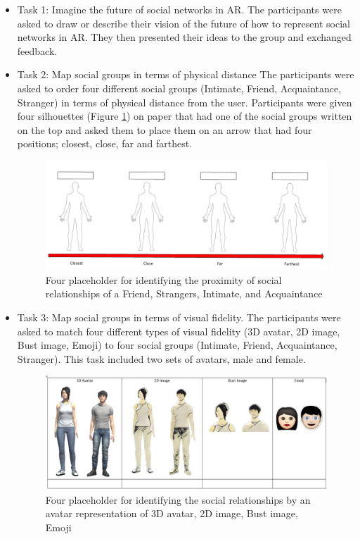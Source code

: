 \begin{itemize}
    \item {Task 1: Imagine the future of social networks in AR. The participants were asked to draw or describe their vision of the future of how to represent social networks in AR. They then presented their ideas to the group and exchanged feedback.
    }
    
    \item {Task 2: Map social groups in terms of physical distance The participants were asked to order four different social groups (Intimate, Friend, Acquaintance, Stranger) in terms of physical distance from the user. Participants were given four silhouettes (Figure \ref{fig:contacts:silhouettes}) on paper that had one of the social groups written on the top and asked them to place them on an arrow that had four positions; closest, close, far and farthest.
\begin{figure}[ht]
    \centering
    \includegraphics[width=\linewidth]{images/41-visualising-mgia17/silhouettes.PNG}
    \caption{Four placeholder for identifying the proximity of social relationships of a Friend, Strangers, Intimate, and Acquaintance}
    \label{fig:contacts:silhouettes}
\end{figure}
    }
    
    \item {Task 3: Map social groups in terms of visual fidelity. The participants were asked to match four different types of visual fidelity (3D avatar, 2D image, Bust image, Emoji) to four social groups (Intimate, Friend, Acquaintance, Stranger). This task included two sets of avatars, male and female.
\begin{figure}[ht]
    \centering
    \includegraphics[width=\linewidth]{images/41-visualising-mgia17/avatars.PNG}
    \caption{Four placeholder for identifying the social relationships by an avatar representation of 3D avatar, 2D image, Bust image, Emoji}
    \label{fig:contacts:avatars}
\end{figure}    
    }
\end{itemize}

